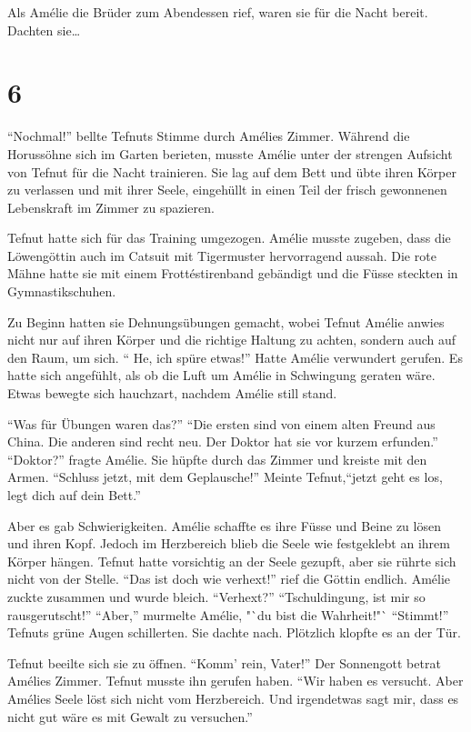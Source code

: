 \documentclass[11pt,titlepage,a5paper]{book}
\begin{document}
Als Amélie die Brüder zum Abendessen rief, waren sie für die Nacht bereit. Dachten sie\dots

\section*{6}

"`Nochmal!"' bellte Tefnuts Stimme durch Amélies Zimmer. Während die Horussöhne sich im Garten berieten, musste Amélie unter der strengen Aufsicht von Tefnut für die Nacht trainieren. Sie lag auf dem Bett und übte ihren Körper zu verlassen und mit ihrer Seele, eingehüllt in einen Teil der frisch gewonnenen Lebenskraft im Zimmer zu spazieren. 

Tefnut hatte sich für das Training umgezogen. Amélie musste zugeben, dass die Löwengöttin auch im Catsuit mit Tigermuster hervorragend aussah. Die rote Mähne hatte sie mit einem Frottéstirenband gebändigt und die Füsse steckten in Gymnastikschuhen.

Zu Beginn hatten sie Dehnungsübungen gemacht, wobei Tefnut Amélie anwies nicht nur auf ihren Körper und die richtige Haltung zu achten, sondern auch auf den Raum, um sich. "` He, ich spüre etwas!"' Hatte Amélie verwundert gerufen. Es hatte sich angefühlt, als ob die Luft um Amélie in Schwingung geraten wäre. Etwas bewegte sich hauchzart, nachdem Amélie still stand. 

"`Was für Übungen waren das?"' "`Die ersten sind von einem alten Freund aus China. Die anderen sind recht neu. Der Doktor hat sie vor kurzem erfunden."'  "`Doktor?"' fragte Amélie. Sie hüpfte durch das Zimmer und kreiste mit den Armen. "`Schluss jetzt, mit dem Geplausche!"' Meinte Tefnut,"`jetzt geht es los, legt dich auf dein Bett."'

Aber es gab Schwierigkeiten. Amélie schaffte es ihre Füsse und Beine zu lösen und ihren Kopf. Jedoch im Herzbereich blieb die Seele wie festgeklebt an ihrem Körper hängen. Tefnut hatte vorsichtig an der Seele gezupft, aber sie rührte sich nicht von der Stelle. "`Das ist doch wie verhext!"' rief die Göttin endlich. Amélie zuckte zusammen und wurde bleich. "`Verhext?"' "`Tschuldingung, ist mir so rausgerutscht!"' "`Aber,"' murmelte Amélie, "`du bist die Wahrheit!"` "`Stimmt!"' Tefnuts grüne Augen schillerten. Sie dachte nach. Plötzlich klopfte es an der Tür.

Tefnut beeilte sich sie zu öffnen. "`Komm' rein, Vater!"' Der Sonnengott betrat Amélies Zimmer. Tefnut musste ihn gerufen haben. "`Wir haben es versucht. Aber Amélies Seele löst sich nicht vom Herzbereich. Und irgendetwas sagt mir, dass es nicht gut wäre es mit Gewalt zu versuchen."'
\end{document}
